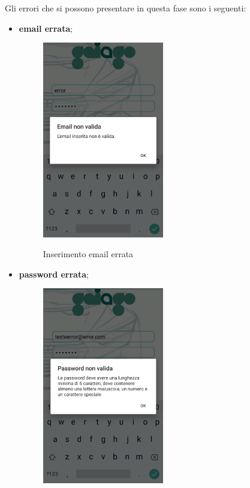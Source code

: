 \pagebreak
Gli errori che si possono presentare in questa fase sono i seguenti:
\begin{itemize}
	\item \textbf{email errata};
	 \begin{figure}[H] 
		\centering 
		\includegraphics[width=0.5\textwidth]{res/images/errore_email.png}\\
		\caption{Inserimento email errata}
		\label{error_mail}
	\end{figure}
\pagebreak
	\item \textbf{password errata};
	\begin{figure}[H] 
		\centering 
		\includegraphics[width=0.5\textwidth]{res/images/errore_psw.png}\\

\end{figure}
\end{itemize}
